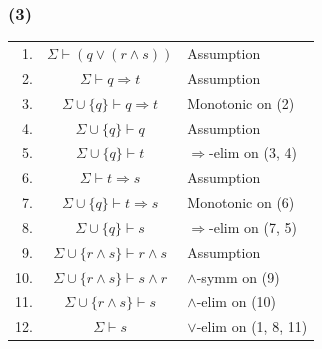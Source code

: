 \documentclass{article}
\begin{document}
\subsubsection*{(3)}
\begin{tabular}{r c l}
    1. & $\Sigma\vdash(q\lor (r\wedge s))$ & Assumption\\
    2. & $\Sigma\vdash q\Rightarrow t$ & Assumption\\
    3. & $\Sigma\cup\{q\}\vdash q\Rightarrow t$ & Monotonic on (2)\\
    4. & $\Sigma\cup\{q\}\vdash q$ & Assumption\\
    5. & $\Sigma\cup\{q\}\vdash t$ & $\Rightarrow$-elim on (3, 4)\\
    6. & $\Sigma\vdash t\Rightarrow s$ & Assumption\\
    7. & $\Sigma\cup\{q\}\vdash t\Rightarrow s$ & Monotonic on (6)\\
    8. & $\Sigma\cup\{q\}\vdash s$ & $\Rightarrow$-elim on (7, 5)\\
    9. & $\Sigma\cup\{r\wedge s\}\vdash r\wedge s$ & Assumption\\
    10. & $\Sigma\cup\{r\wedge s\}\vdash s\wedge r$ & $\wedge$-symm on (9)\\
    11. & $\Sigma\cup\{r\wedge s\}\vdash s$ & $\wedge$-elim on (10)\\
    12. & $\Sigma\vdash s$ & $\lor$-elim on (1, 8, 11)\\
\end{tabular}
\end{document}
